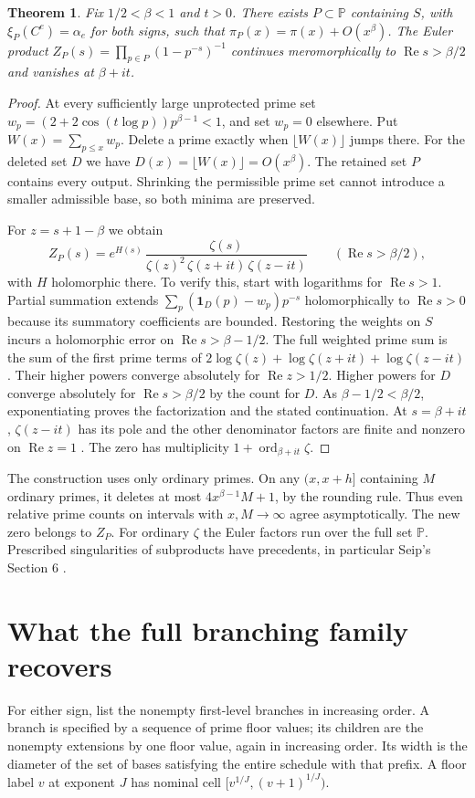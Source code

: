 \documentclass[11pt]{article}
\newtheorem{theorem}{Theorem}
\newcommand{\PP}{\mathbb P}
\newcommand{\floor}[1]{\lfloor #1\rfloor}
\newcommand{\Rea}{\operatorname{Re}}
\begin{document}
\begin{theorem}\label{th:cut}
Fix $1/2<\beta<1$ and $t>0$. There exists $P\subset\PP$ containing $S$, with $\xi_P(C^e)=\alpha_e$ for both signs, such that $\pi_P(x)=\pi(x)+O(x^\beta)$. The Euler product $Z_P(s)=\prod_{p\in P}(1-p^{-s})^{-1}$ continues meromorphically to $\Rea s>\beta/2$ and vanishes at $\beta+it$.
\end{theorem}
\begin{proof}
At every sufficiently large unprotected prime set $w_p=(2+2\cos(t\log p))p^{\beta-1}<1$, and set $w_p=0$ elsewhere. Put $W(x)=\sum_{p\le x}w_p$. Delete a prime exactly when $\floor{W(x)}$ jumps there. For the deleted set $D$ we have $D(x)=\floor{W(x)}=O(x^\beta)$. The retained set $P$ contains every output. Shrinking the permissible prime set cannot introduce a smaller admissible base, so both minima are preserved.

For $z=s+1-\beta$ we obtain
\[
 Z_P(s)=e^{H(s)}\,
 \frac{\zeta(s)}
 {\zeta(z)^2\,\zeta(z+it)\,\zeta(z-it)}
 \qquad(\Rea s>\beta/2),
\]
with $H$ holomorphic there. To verify this, start with logarithms for $\Rea s>1$. Partial summation extends $\sum_p(\mathbf1_D(p)-w_p)p^{-s}$ holomorphically to $\Rea s>0$ because its summatory coefficients are bounded. Restoring the weights on $S$ incurs a holomorphic error on $\Rea s>\beta-1/2$. The full weighted prime sum is the sum of the first prime terms of $2\log\zeta(z)+\log\zeta(z+it)+\log\zeta(z-it)$. Their higher powers converge absolutely for $\Rea z>1/2$. Higher powers for $D$ converge absolutely for $\Rea s>\beta/2$ by the count for $D$. As $\beta-1/2<\beta/2$, exponentiating proves the factorization and the stated continuation. At $s=\beta+it$, $\zeta(z-it)$ has its pole and the other denominator factors are finite and nonzero on $\Rea z=1$ \cite{dlmf}. The zero has multiplicity $1+\operatorname{ord}_{\beta+it}\zeta$.
\end{proof}
The construction uses only ordinary primes. On any $(x,x+h]$ containing $M$ ordinary primes, it deletes at most $4x^{\beta-1}M+1$, by the rounding rule. Thus even relative prime counts on intervals with $x,M\to\infty$ agree asymptotically. The new zero belongs to $Z_P$. For ordinary $\zeta$ the Euler factors run over the full set $\PP$. Prescribed singularities of subproducts have precedents, in particular Seip's Section 6 \cite{seip}.

\section{What the full branching family recovers}
For either sign, list the nonempty first-level branches in increasing order. A branch is specified by a sequence of prime floor values; its children are the nonempty extensions by one floor value, again in increasing order. Its width is the diameter of the set of bases satisfying the entire schedule with that prefix. A floor label $v$ at exponent $J$ has nominal cell $[v^{1/J},(v+1)^{1/J})$.
\end{document}
